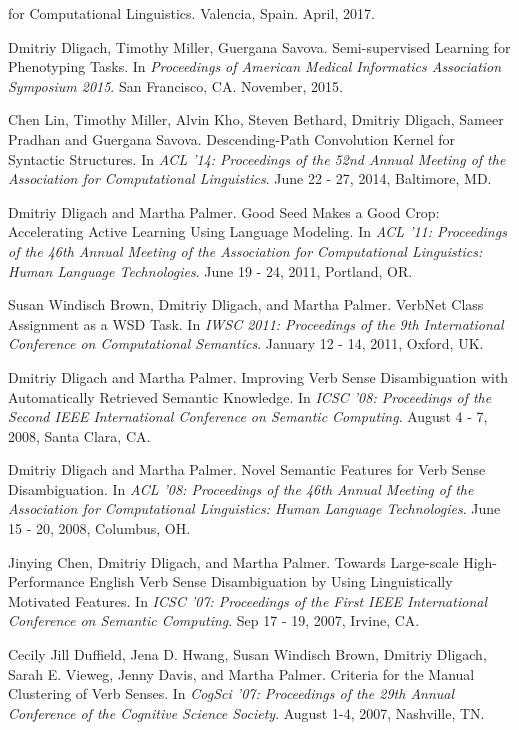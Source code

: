 \documentclass[letterpaper]{article}
\renewenvironment{itemize}{
  \begin{list}{}{
    \setlength{\leftmargin}{1.5em}
  }
}{
  \end{list}
}
\begin{document}
\begin{itemize}
{for Computational Linguistics}. Valencia, Spain. April, 2017.
\item Dmitriy Dligach, Timothy Miller, Guergana Savova. Semi-supervised Learning for Phenotyping Tasks. In \emph{Proceedings of American Medical Informatics Association Symposium 2015}. San Francisco, CA. November, 2015.
\item Chen Lin, Timothy Miller, Alvin Kho, Steven Bethard, Dmitriy Dligach, Sameer Pradhan and Guergana Savova. Descending-Path Convolution Kernel for Syntactic Structures. In \emph {ACL '14: Proceedings of the 52nd Annual Meeting of the Association for Computational Linguistics}. June 22 - 27, 2014, Baltimore, MD.
\item Dmitriy Dligach and Martha Palmer. Good Seed Makes a Good Crop: Accelerating Active Learning Using Language Modeling. In \emph {ACL '11: Proceedings of the 46th Annual Meeting of the Association for Computational Linguistics: Human Language Technologies}. June 19 - 24, 2011, Portland, OR.
\item Susan Windisch Brown, Dmitriy Dligach, and Martha Palmer. VerbNet Class Assignment as a WSD Task. In \emph {IWSC 2011: Proceedings of the 9th International Conference on Computational Semantics}. January 12 - 14, 2011, Oxford, UK.
\item Dmitriy Dligach and Martha Palmer. Improving Verb Sense Disambiguation with Automatically Retrieved Semantic Knowledge. In \emph {ICSC '08: Proceedings of the Second IEEE International Conference on Semantic Computing}. August 4 - 7, 2008, Santa Clara, CA.
\item Dmitriy Dligach and Martha Palmer. Novel Semantic Features for Verb Sense Disambiguation. In \emph {ACL '08: Proceedings of the 46th Annual Meeting of the Association for Computational Linguistics: Human Language Technologies}. June 15 - 20, 2008, Columbus, OH.
\item Jinying Chen, Dmitriy Dligach, and Martha Palmer. Towards Large-scale High-Performance English Verb Sense Disambiguation by Using Linguistically Motivated Features. In \emph {ICSC '07: Proceedings of the First IEEE International Conference on Semantic Computing}. Sep 17 - 19, 2007, Irvine, CA.
\item Cecily Jill Duffield, Jena D. Hwang, Susan Windisch Brown, Dmitriy Dligach, Sarah E. Vieweg, Jenny Davis, and Martha Palmer. Criteria for the Manual Clustering of Verb Senses. In \emph {CogSci '07: Proceedings of the 29th Annual Conference of the Cognitive Science Society}. August 1-4, 2007, Nashville, TN.
\end{itemize}
\end{document}
